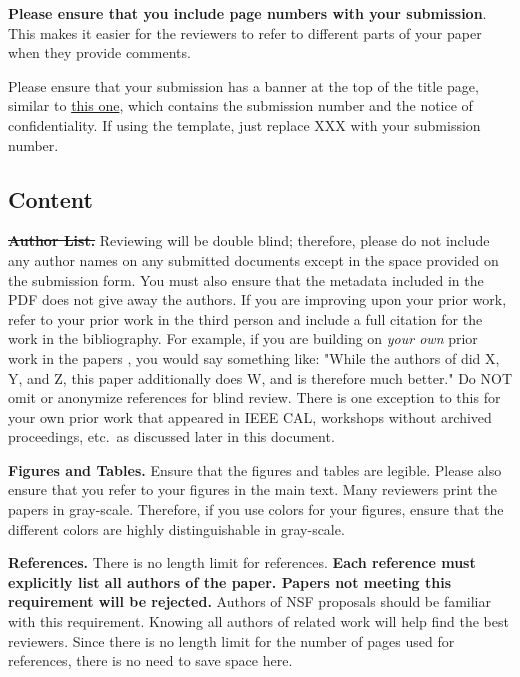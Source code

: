 \documentclass{sig-alternate}
\begin{document}
\textbf{Please ensure that you include page numbers with your
submission}. This makes it easier for the reviewers to refer to different
parts of your paper when they provide comments.

Please ensure that your submission has a banner at the top of the
title page, similar to
\href{http://hpca2018.ece.ucsb.edu/docs/hpca24.pdf}{this one},
which contains the submission number and the notice of
confidentiality.  If using the template, just replace XXX with your
submission number.

\subsection{Content}

\noindent\textbf{\sout{Author List.}} Reviewing will be double blind;
therefore, please do not include any author names on any submitted
documents except in the space provided on the submission form.  You must
also ensure that the metadata included in the PDF does not give away the
authors. If you are improving upon your prior work, refer to your prior
work in the third person and include a full citation for the work in the
bibliography.  For example, if you are building on {\em your own} prior
work in the papers \cite{nicepaper1,nicepaper2,nicepaper3}, you would say
something like: "While the authors of
\cite{nicepaper1,nicepaper2,nicepaper3} did X, Y, and Z, this paper
additionally does W, and is therefore much better."  Do NOT omit or
anonymize references for blind review.  There is one exception to this for
your own prior work that appeared in IEEE CAL, workshops without archived
proceedings, etc.\, as discussed later in this document.

\noindent\textbf{Figures and Tables.} Ensure that the figures and tables
are legible.  Please also ensure that you refer to your figures in the main
text.  Many reviewers print the papers in gray-scale. Therefore, if you use
colors for your figures, ensure that the different colors are highly
distinguishable in gray-scale.

\noindent\textbf{References.}  There is no length limit for references.
{\bf Each reference must explicitly list all authors of the paper.  Papers
not meeting this requirement will be rejected.} Authors of NSF proposals
should be familiar with this requirement. Knowing all authors of related
work will help find the best reviewers. Since there is no length limit
for the number of pages used for references, there is no need to save space
here.
\end{document}
